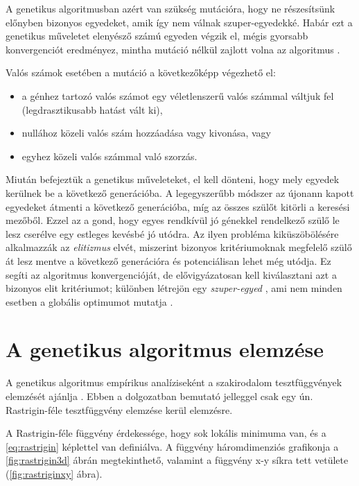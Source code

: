 A genetikus algoritmusban azért van szükség mutációra, hogy ne részesítsünk előnyben bizonyos egyedeket, amik így nem válnak szuper-egyedekké. Habár ezt a genetikus műveletet elenyésző számú egyeden végzik el, mégis gyorsabb konvergenciót eredményez, mintha mutáció nélkül zajlott volna az algoritmus \parencite{kanovic2017}.

Valós számok esetében a mutáció a következőképp végezhető el:

\begin{itemize}
    \item a génhez tartozó valós számot egy véletlenszerű valós számmal váltjuk fel (legdrasztikusabb hatást vált ki),
	\item nullához közeli valós szám hozzáadása vagy kivonása, vagy
	\item egyhez közeli valós számmal való szorzás.
\end{itemize}

Miután befejeztük a genetikus műveleteket, el kell dönteni, hogy mely egyedek kerülnek be a következő generációba. A legegyszerűbb módszer az újonann kapott egyedeket átmenti a következő generációba, míg az összes szülőt kitörli a keresési mezőből. Ezzel az a gond, hogy egyes rendkívül jó génekkel rendelkező szülő le lesz cserélve egy estleges kevésbé jó utódra. Az ilyen probléma kiküszöbölésére alkalmazzák az \textit{elitizmus}  elvét, miszerint bizonyos kritériumoknak megfelelő szülő át lesz mentve a következő generációra és potenciálisan lehet még utódja. Ez segíti az algoritmus konvergencióját, de elővigyázatosan kell kiválasztani azt a bizonyos elit kritériumot; különben létrejön egy \textit{szuper-egyed} , ami nem minden esetben a globális optimumot mutatja \parencite{kanovic2017}.

\section{A genetikus algoritmus elemzése}

A genetikus algoritmus empírikus analíziseként a szakirodalom tesztfüggvények elemzését ajánlja \parencite{kanovic2017}. Ebben a dolgozatban bemutató jelleggel csak egy ún. Rastrigin-féle tesztfüggvény  elemzése kerül elemzésre.

A Rastrigin-féle függvény érdekessége, hogy sok lokális minimuma van, és a \ref{eq:rastrigin} képlettel van definiálva. A függvény háromdimenziós grafikonja a \ref{fig:rastrigin3d} ábrán megtekinthető, valamint a függvény x-y síkra tett vetülete (\ref{fig:rastriginxy} ábra).

